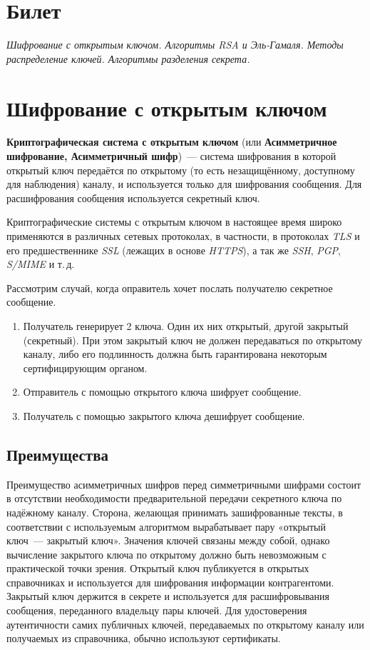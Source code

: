 \documentclass[a4paper,10pt]{article}
\begin{document}
\section*{Билет }
{\em Шифрование с открытым ключом. Алгоритмы RSA и Эль-Гамаля.
Методы распределение ключей. Алгоритмы разделения секрета.}

\section{Шифрование с открытым ключом} 
{\bf Криптографическая система с открытым ключом} (или {\bf Асимметричное шифрование, Асимметричный шифр})~--- система шифрования 
в которой открытый ключ передаётся по открытому (то есть незащищённому, доступному для наблюдения) каналу, и
используется только для шифрования сообщения. Для расшифрования сообщения используется секретный ключ.

Криптографические системы с открытым ключом в настоящее время широко применяются в различных сетевых протоколах, в частности, в протоколах
{\it TLS\/} и его предшественнике {\it SSL} (лежащих в основе {\it HTTPS}), а так же {\it SSH}, {\it PGP}, {\it S/MIME} и т.\,д.

Рассмотрим случай, когда оправитель хочет послать получателю секретное сообщение.
\begin{enumerate}
   \item Получатель генерирует 2 ключа. Один их них открытый, другой закрытый (секретный). При этом закрытый ключ не должен передаваться по
      открытому каналу, либо его подлинность должна быть гарантирована некоторым сертифицирующим органом.

   \item Отправитель с помощью открытого ключа шифрует сообщение.
   
   \item Получатель с помощью закрытого ключа дешифрует сообщение.

\end{enumerate}

\subsection{Преимущества}
Преимущество асимметричных шифров перед симметричными шифрами состоит в отсутствии необходимости предварительной передачи секретного ключа
по надёжному каналу. Сторона, желающая принимать зашифрованные тексты, в соответствии с используемым алгоритмом вырабатывает пару «открытый
ключ~--- закрытый ключ». Значения ключей связаны между собой, однако вычисление закрытого ключа по открытому должно быть невозможным с
практической точки зрения. Открытый ключ публикуется в открытых справочниках и используется для шифрования информации контрагентоми.
Закрытый ключ держится в секрете и используется для расшифровывания сообщения, переданного владельцу пары ключей.
Для удостоверения аутентичности самих публичных ключей, передаваемых по открытому каналу или получаемых из справочника, обычно
используют сертификаты.
\end{document}
